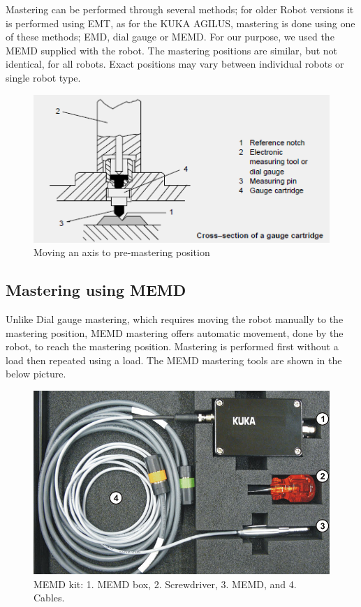 Mastering can be performed through several methods; for older Robot versions it is performed using EMT, as for the KUKA AGILUS, mastering is done using one of these methods; EMD, dial gauge or MEMD. For our purpose, we used the MEMD supplied with the robot. The mastering positions are similar, but not identical, for all robots. Exact positions may vary between individual robots or single robot type. 
\begin{figure}
    \centering
    \includegraphics[width=0.7\linewidth]{figures/mastering2}
	\caption{Moving an axis to pre-mastering position}
    \label{fig:mastering2}
\end{figure}

\subsection{Mastering using MEMD}
Unlike Dial gauge mastering, which requires moving the robot manually to the mastering position, MEMD mastering offers automatic movement, done by the robot, to reach the mastering position. Mastering is performed first without a load then repeated using a load. The MEMD mastering tools are shown in the below picture.
\begin{figure}
    \centering
    \includegraphics[width=0.7\linewidth]{figures/mastering3}
	\caption{MEMD kit: 1. MEMD box, 2. Screwdriver, 3. MEMD, and 4. Cables.}
    \label{fig:mastering3}
\end{figure}

